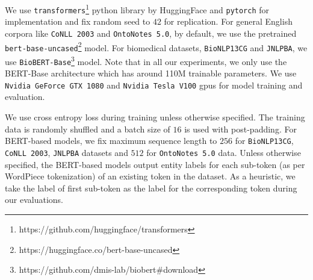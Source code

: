 We use \texttt{transformers}\footnote{https://github.com/huggingface/transformers} python library by HuggingFace and \texttt{pytorch} for implementation and fix random seed to $42$ for replication. For general English corpora like \texttt{CoNLL 2003} and \texttt{OntoNotes 5.0}, by default, we use the pretrained \texttt{bert-base-uncased}\footnote{https://huggingface.co/bert-base-uncased} model. For biomedical datasets, \texttt{BioNLP13CG} and \texttt{JNLPBA}, we use \texttt{BioBERT-Base}\footnote{https://github.com/dmis-lab/biobert\#download} model. Note that in all our experiments, we only use the BERT-Base architecture which has around 110M trainable parameters. We use \texttt{Nvidia GeForce GTX 1080} and \texttt{Nvidia Tesla V100} gpus for model training and evaluation.

We use cross entropy loss during training unless otherwise specified. The training data is randomly shuffled and a batch size of $16$ is used with post-padding. For BERT-based models, we fix maximum sequence length to $256$ for \texttt{BioNLP13CG}, \texttt{CoNLL 2003}, \texttt{JNLPBA} datasets and $512$ for \texttt{OntoNotes 5.0} data. Unless otherwise specified, the BERT-based models output entity labels for each sub-token (as per WordPiece tokenization) of an existing token in the dataset. As a heuristic, we take the label of first sub-token as the label for the corresponding token during our evaluations.
